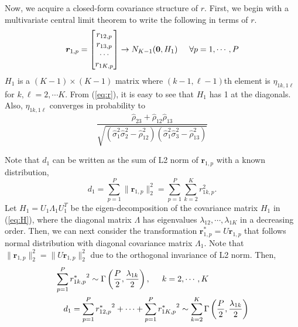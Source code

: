 \documentclass[aap,authoryear, preprint]{imsart}
\numberwithin{equation}{section}
\theoremstyle{plain}
\begin{document}
Now, we acquire a closed-form covariance structure of $r$. First, we begin with a multivariate central limit theorem to write the following in terms of $r$.
\begin{equation}
\bm{r}_{1,p} = \begin{bmatrix}
r_{12,p} \\ r_{13, p} \\ \cdots \\ r_{1K,p}
\end{bmatrix}  \rightarrow N_{K-1}(\bm{0}, H_1) \hspace{5mm} \forall p = 1, \cdots, P
\label{eq:H}
\end{equation}
$H_1$ is a $(K-1) \times (K-1)$ matrix where $(k-1, \ell-1)$th element is $\eta_{1k, 1\ell}$ for $k, \ell = 2, \cdots K$. From (\ref{eq:r}), it is easy to see that $H_1$ has 1 at the diagonals. Also, $\eta_{1k, 1\ell}$ converges in probability to
\begin{equation}
\frac{\hat{\rho}_{23} + \hat{\rho}_{12}\hat{\rho}_{13}}{
\sqrt{(\hat{\sigma}_1^2\hat{\sigma}_2^2 - \hat{\rho}_{12}^2)(\hat{\sigma}_1^2\hat{\sigma}_3^2 - \hat{\rho}_{13}^2)}}
\label{eq:eta}\end{equation}

Note that $d_1$ can be written as the sum of L2 norm of $\bm{r}_{1,p}$ with a known distribution, 
\begin{equation}
d_1 = \sum_{p=1}^{P} \|\bm{r}_{1,p}\|_2^2 = \sum_{p=1}^{P} \sum_{k=2}^K r_{1k,p}^2.
\label{eq:d2}
\end{equation}
Let $H_1 = U_1 \Lambda_1 U_1^T$ be the eigen-decomposition of the covariance matrix $H_1$ in (\ref{eq:H}), where the diagonal matrix $\Lambda$ has eigenvalues $\lambda_{12}, \cdots, \lambda_{1K}$ in a decreasing order. Then, we can next consider the transformation $\bm{r}_{1,p}^* = U\bm{r}_{1,p}$ that follows normal distribution with diagonal covariance matrix $\Lambda_1$. Note that $\|\bm{r}_{1,p}\|_2^2 = \|U\bm{r}_{1,p}\|_2^2$ due to the orthogonal invariance of L2 norm. Then,
\begin{equation}
    \begin{multlined}
    \sum_{p=1}^{P} {r_{1k,p}^*}^2 \sim \Gamma \left( \frac{P}{2}, \frac{\lambda_{1k}}{2} \right), \hspace{5mm} k = 2, \cdots, K\\
    d_1 =  \sum_{p=1}^{P} {r_{12,p}^*}^2 + \cdots +\sum_{p=1}^P{r_{1K,p}^*}^2 \sim \sum_{k=2}^{K} \Gamma \left( \frac{P}{2}, \frac{\lambda_{1k}}{2}\right)
    \end{multlined}
    \label{eq:d_dist}
\end{equation}
\end{document}
